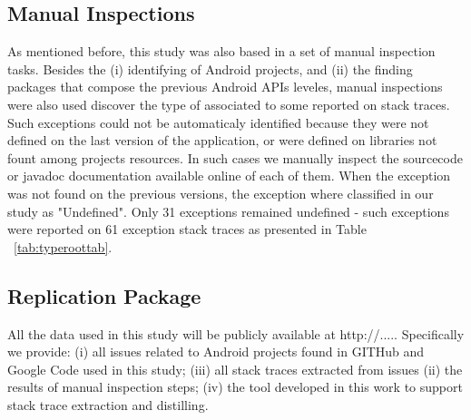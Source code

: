 \documentclass[conference]{IEEEtran}
\begin{document}
\subsection{Manual Inspections}
As mentioned before, this study was also based in a set of manual inspection tasks. Besides the 
 (i) identifying of Android projects, and (ii) the finding packages that compose the 
previous Android APIs leveles, manual inspections were also used discover the type of associated to some 
reported on stack traces. Such exceptions could not be automaticaly identified 
because they were not defined on the last version of the application,
or were defined on libraries not fount among projects resources.
In such cases we manually inspect the sourcecode or javadoc
 documentation available online of each of them. 
When the exception was not found on the previous versions, the exception where classified 
in our study as "Undefined".  Only 31 exceptions 
remained undefined - such exceptions were reported on 61 exception stack traces as 
presented in Table ~\ref{tab:typeroottab}.





\subsection{Replication Package}
All the data used in this study will be publicly available at http://.....
Specifically we provide: (i) all issues related to Android projects found
in GITHub and Google Code used in this study; (iii) all stack traces extracted
from issues (ii) the results of manual inspection steps; (iv) the tool developed 
in this work to support stack trace extraction and distilling.
\end{document}
